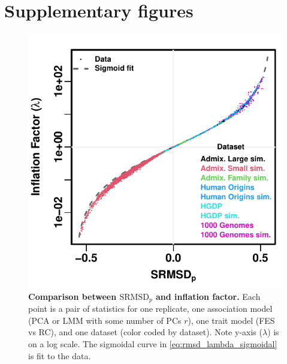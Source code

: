 \documentclass[11pt]{article}
\newcommand{\rmsd}{\text{SRMSD}_p}
\newcommand{\beginsupplement}{%
  \setcounter{table}{0}
  \renewcommand{\thetable}{S\arabic{table}}%
  \setcounter{figure}{0}
  \renewcommand{\thefigure}{S\arabic{figure}}%
  \setcounter{section}{0}
  \renewcommand{\thesection}{S\arabic{section}}%
  \setcounter{equation}{0}
  \renewcommand{\theequation}{S\arabic{equation}}%
  \setcounter{page}{1}
  \renewcommand{\thepage}{S\arabic{page}}%
}
\begin{document}
\printbibliography


\clearpage

\beginsupplement

\section{Supplementary figures}

\begin{figure}[hp!]
  \centering
  \includegraphics{sum-rmsd-vs-lambda.pdf}
  \caption{
    {\bf Comparison between $\rmsd$ and inflation factor.}
    Each point is a pair of statistics for one replicate, one association model (PCA or LMM with some number of PCs $r$), one trait model (FES vs RC), and one dataset (color coded by dataset).
    Note y-axis ($\lambda$) is on a log scale.
    The sigmoidal curve in \cref{eq:rmsd_lambda_sigmoidal} is fit to the data.
  }
  \label{fig:rmsd_lambda}
\end{figure}
\end{document}
